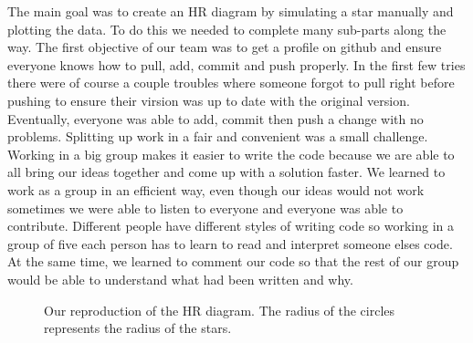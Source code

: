 \documentclass[10pt]{article}
\begin{document}
The main goal was to create an HR diagram by simulating a star manually and plotting the data. To do this we needed to complete many sub-parts along the way. The first objective of our team was to get a profile on github and ensure everyone knows how to pull, add, commit and push properly. In the first few tries there were of course a couple troubles where someone forgot to pull right before pushing to ensure their virsion was up to date with the original version. Eventually, everyone was able to add, commit then push a change with no problems. Splitting up work in a fair and convenient was a small challenge. Working in a big group makes it easier to write the code because we are able to all bring our ideas together and come up with a solution faster. We learned to work as a group in an efficient way, even though our ideas would not work sometimes we were able to listen to everyone and everyone was able to contribute. Different people have different styles of writing code so working in a group of five each person has to learn to read and interpret someone elses code. At the same time, we learned to comment our code so that the rest of our group would be able to understand what had been written and why.\\

\begin{figure}[p]
 \begin{centering}
  
  \caption{Our reproduction of the HR diagram. The radius of the circles represents the radius of the stars.}
\label{fig:HR}
 \end{centering}
\end{figure}
\end{document}
